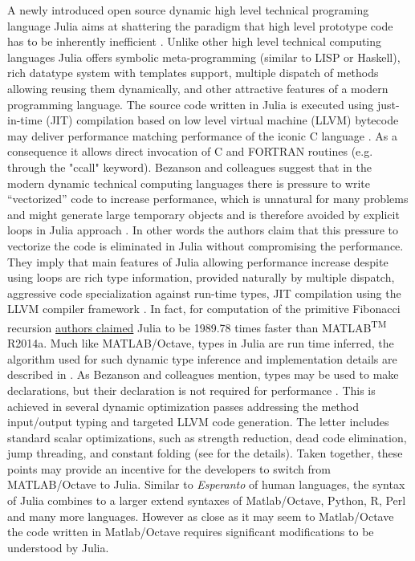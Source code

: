 A newly introduced open source dynamic high level technical programing language Julia aims at shattering the paradigm that high level prototype code has to be inherently inefficient \cite{bezanson2012julia, bezanson2014julia}.  Unlike other high level technical computing languages Julia offers symbolic meta-programming (similar to LISP or Haskell), rich datatype system with templates support, multiple dispatch of methods allowing reusing them dynamically, and other attractive features of a modern programming language. The source code written in Julia is executed using just-in-time (JIT) compilation based on low level virtual machine (LLVM) \cite{Lattner_2004} bytecode may deliver performance matching performance of the iconic C language \cite{bezanson2012julia, bezanson2014julia}. As a consequence it allows direct invocation of C and FORTRAN routines (e.g. through the "ccall" keyword). Bezanson and colleagues suggest that in the modern dynamic technical computing languages there is pressure to write “vectorized” code to increase performance, which is unnatural for many problems and might generate large temporary objects and is therefore avoided by explicit loops in Julia approach \cite{bezanson2012julia}. In other words the authors claim that this pressure to vectorize the code is eliminated in Julia without compromising the performance. They imply that main features of Julia allowing performance increase despite using loops are rich type information, provided naturally by multiple dispatch, aggressive code specialization against run-time types, JIT compilation using the LLVM compiler framework \cite{bezanson2012julia, Lattner_2004}. In fact, for computation of the primitive Fibonacci recursion \href{http://julialang.org/benchmarks/}{authors claimed} Julia to be 1989.78 times faster than MATLAB\textsuperscript{TM} R2014a. Much like MATLAB/Octave, types in Julia are run time inferred, the algorithm used for such dynamic type inference and implementation details are described in \cite{Kaplan_1980, bezanson2012julia}. As Bezanson and colleagues mention, types may be used to make declarations, but their declaration is not required for performance \cite{bezanson2012julia}. This is achieved in several dynamic optimization passes addressing the method input/output typing and targeted LLVM code generation. The letter includes standard scalar optimizations, such as strength reduction, dead code elimination, jump threading, and constant folding (see \cite{bezanson2012julia} for the details). Taken together, these points may provide an incentive for the developers to switch from MATLAB/Octave to Julia. Similar to \textit{Esperanto} of human languages, the syntax of Julia combines to a larger extend syntaxes of Matlab/Octave, Python, R, Perl and many more languages. However as close as it may seem to Matlab/Octave the code written in Matlab/Octave requires significant modifications to be understood by Julia.


